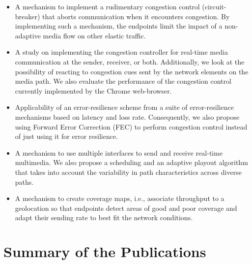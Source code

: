 \begin{itemize}
\setlength{\itemsep}{0pt}


\item A mechanism to implement a rudimentary congestion control (circuit-breaker) 
that aborts communication when it encounters congestion. By
implementing such a mechanism, the endpoints limit the impact of a non-adaptive
media flow on other elastic traffic.

\item A study on implementing the congestion controller for real-time media
communication at the sender, receiver, or both. Additionally, we look at the
possibility of reacting to congestion cues sent by the network elements on the
media path. We also evaluate the performance of the congestion control
currently implemented by the Chrome web-browser.

\item Applicability of an error-resilience scheme from a suite of
error-resilience mechanisms based on latency and loss rate. Consequently, we
also propose using Forward Error Correction (FEC) to perform congestion
control instead of just using it for error resilience.

\item A mechanism to use multiple interfaces to send and receive real-time
multimedia. We also propose a scheduling and an adaptive playout algorithm
that takes into account the variability in path characteristics across diverse
paths.

\item A mechanism to create coverage maps, i.e., associate throughput to a
geolocation so that endpoints detect areas of good and poor coverage and
adapt their sending rate to best fit the network conditions.

\end{itemize}

\section{Summary of the Publications}

